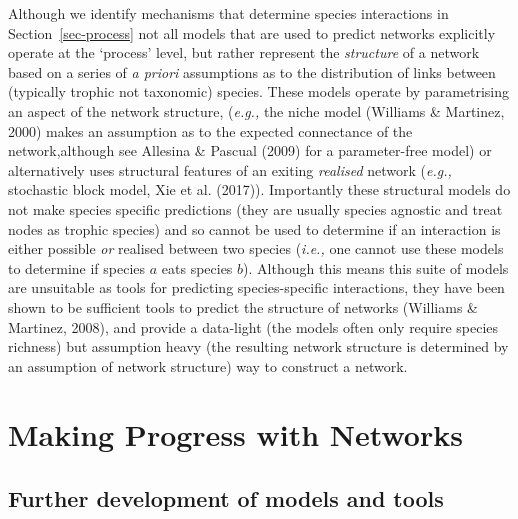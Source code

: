 \documentclass[
]{article}
\begin{document}
Although we identify mechanisms that determine species interactions in
Section~\ref{sec-process} not all models that are used to predict
networks explicitly operate at the `process' level, but rather represent
the \emph{structure} of a network based on a series of \emph{a priori}
assumptions as to the distribution of links between (typically trophic
not taxonomic) species. These models operate by parametrising an aspect
of the network structure, (\emph{e.g.,} the niche model (Williams \&
Martinez, 2000) makes an assumption as to the expected connectance of
the network,although see Allesina \& Pascual (2009) for a parameter-free
model) or alternatively uses structural features of an exiting
\emph{realised} network (\emph{e.g.,} stochastic block model, Xie et al.
(2017)). Importantly these structural models do not make species
specific predictions (they are usually species agnostic and treat nodes
as trophic species) and so cannot be used to determine if an interaction
is either possible \emph{or} realised between two species (\emph{i.e.,}
one cannot use these models to determine if species \(a\) eats species
\(b\)). Although this means this suite of models are unsuitable as tools
for predicting species-specific interactions, they have been shown to be
sufficient tools to predict the structure of networks (Williams \&
Martinez, 2008), and provide a data-light (the models often only require
species richness) but assumption heavy (the resulting network structure
is determined by an assumption of network structure) way to construct a
network.

\section{Making Progress with
Networks}\label{making-progress-with-networks}

\subsection{Further development of models and
tools}\label{further-development-of-models-and-tools}
\end{document}
